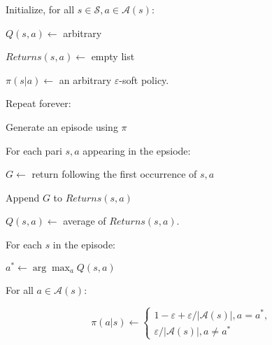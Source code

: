 \documentclass[11pt,a4paper]{article}
\def\S{{\mathcal S}}
\def\A{{\mathcal A}}
\begin{document}
\begin{tcolorbox}
Initialize, for all $s\in \S, a \in \A(s)$: \par
\hspace{1cm} $Q(s,a) \leftarrow$ arbitrary \par 
\hspace{1cm} $Returns(s,a) \leftarrow$ empty list \par 
\hspace{1cm} $\pi(s|a) \leftarrow$ an arbitrary $\varepsilon$-soft policy.\par 
Repeat forever:\par 
\hspace{1cm} Generate an episode using $\pi$\par 
\hspace{1cm} For each pari $s,a$ appearing in the epsiode:\par
\hspace{2cm} $G \leftarrow$ return following the first occurrence of $s,a$ \par 
\hspace{2cm} Append $G$ to $Returns(s,a)$\par 
\hspace{2cm} $Q(s,a) \leftarrow$ average of $Returns(s,a)$.\par 
\hspace{1cm} For each $s$ in the episode:\par 
\hspace{2cm} $a^* \leftarrow \arg\max_{a}Q(s,a)$\par 
\hspace{2cm} For all $a \in \A(s)$:\par 
\hspace{3cm} \begin{equation}
				\pi(a|s) \leftarrow \left\{ \begin{array}{c}1 - \varepsilon + \varepsilon/ |\A(s)|, a = a^*, \\\varepsilon/ |\A(s)|, a\neq a^* \end{array}\right.
			 \end{equation}
\end{tcolorbox}
\end{document}
